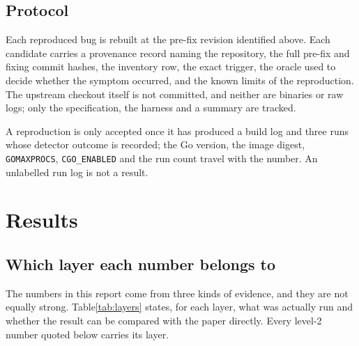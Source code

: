 \documentclass[11pt]{article}
\begin{document}
\subsection{Protocol}

Each reproduced bug is rebuilt at the pre-fix revision identified above.
Each candidate carries a provenance record naming the repository, the full
pre-fix and fixing commit hashes, the inventory row, the exact trigger, the
oracle used to decide whether the symptom occurred, and the known limits of
the reproduction. The upstream checkout itself is not committed, and neither
are binaries or raw logs; only the specification, the harness and a summary
are tracked.

A reproduction is only accepted once it has produced a build log and three
runs whose detector outcome is recorded; the Go version, the image digest,
\texttt{GOMAXPROCS}, \texttt{CGO\_ENABLED} and the run count travel with the
number. An unlabelled run log is not a result.

\section{Results}
\label{sec:results}
\subsection{Which layer each number belongs to}

The numbers in this report come from three kinds of evidence, and they are
not equally strong. Table\ref{tab:layers} states, for each layer, what was
actually run and whether the result can be compared with the paper directly.
Every level-2 number quoted below carries its layer.
\end{document}
